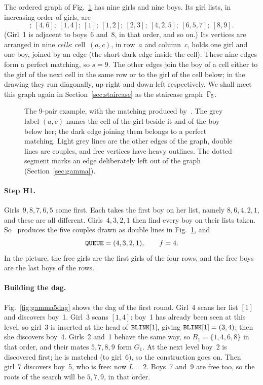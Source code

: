 The ordered graph of Fig.~\ref{fig:gamma5} has nine girls and nine
boys. Its girl lists, in increasing order of girls, are
\begin{equation}
  [6,8];\ [4,6];\ [1,4];\ [1];\ [1,2];\ [2,3];\ [4,2,5];\ [6,5,7];\ [8,9].
  \label{eq:gamma5lists}
\end{equation}
(Girl~1 is adjacent to boys~6 and~8, in that order, and so on.)
Its vertices are arranged in nine \emph{cells}: cell~$(a,c)$, in row~$a$
and column~$c$, holds one girl and one boy, joined by an edge (the short
dark edge inside the cell). These nine edges form a perfect matching, so
$s=9$. The other edges join the boy of a cell either to the girl of the
next cell in the same row or to the girl of the cell below; in the
drawing they run diagonally, up-right and down-left respectively. We
shall meet this graph again in Section~\ref{sec:staircase} as the
staircase graph~$\Gamma_5$.

\begin{figure}[ht]
\centering

\caption{The 9-pair example, with the matching produced by~. The
grey label $(a,c)$ names the cell of the girl beside it and of the boy
below her; the dark edge joining them belongs to a perfect matching.
Light grey lines are the other edges of the graph, double lines are
couples, and free vertices have heavy outlines. The dotted segment
marks an edge deliberately left out of the graph
(Section~\ref{sec:gamma}).}
\label{fig:gamma5}
\end{figure}

\paragraph{Step H1.}
Girls~$9,8,7,6,5$ come first. Each takes the first boy on her list,
namely $8,6,4,2,1$, and these are all different. Girls~$4,3,2,1$ then
find every boy on their lists taken. So~ produces the five couples
drawn as double lines in Fig.~\ref{fig:gamma5}, and
\[
   \texttt{QUEUE}=(4,3,2,1),\qquad f=4 .
\]
In the picture, the free girls are the first girls of the four rows,
and the free boys are the last boys of the rows.

\paragraph{Building the dag.}
Fig.~\ref{fig:gamma5dag} shows the dag of the first round. Girl~4 scans
her list $[1]$ and discovers boy~1. Girl~3 scans $[1,4]$: boy~1 has
already been seen at this level, so girl~3 is inserted at the head of
$\texttt{BLINK}[1]$, giving $\texttt{BLINK}[1]=(3,4)$; then she discovers boy~4.
Girls~2 and~1 behave the same way, so $B_1=\{1,4,6,8\}$ in that order,
and their mates $5,7,8,9$ form $G_1$. At the next level boy~2 is
discovered first; he is matched (to girl~6), so the construction goes
on. Then girl~7 discovers boy~5, who is free: now $L=2$. Boys~7 and~9
are free too, so the roots of the search will be $5,7,9$, in that
order.

